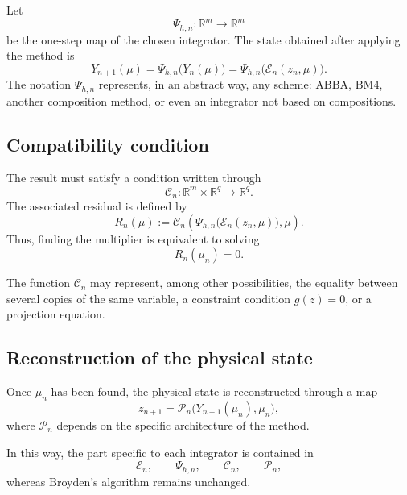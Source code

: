 \documentclass[11pt,a4paper]{article}
\newcommand{\R}{\mathbb{R}}
\begin{document}
Let
\begin{equation}
    \Psi_{h,n}:\R^m\longrightarrow\R^m
    \label{eq:base-integrator}
\end{equation}
be the one-step map of the chosen integrator. The state obtained after
applying the method is
\begin{equation}
    Y_{n+1}(\mu)
    =\Psi_{h,n}\bigl(Y_n(\mu)\bigr)
    =\Psi_{h,n}\bigl(\mathcal E_n(z_n,\mu)\bigr).
    \label{eq:numerical-output}
\end{equation}
The notation $\Psi_{h,n}$ represents, in an abstract way, any scheme: ABBA,
BM4, another composition method, or even an integrator not based on
compositions.

\subsection{Compatibility condition}

The result must satisfy a condition written through
\begin{equation}
    \mathcal C_n:\R^m\times\R^q\longrightarrow\R^q.
    \label{eq:compatibility-map}
\end{equation}
The associated residual is defined by
\begin{equation}
    \boxed{
    R_n(\mu)
    :=\mathcal C_n
    \left(
        \Psi_{h,n}\bigl(\mathcal E_n(z_n,\mu)\bigr),
        \mu
    \right).}
    \label{eq:generic-residual}
\end{equation}
Thus, finding the multiplier is equivalent to solving
\[
    R_n(\mu_n)=0.
\]

The function $\mathcal C_n$ may represent, among other possibilities, the
equality between several copies of the same variable, a constraint condition
$g(z)=0$, or a projection equation.

\subsection{Reconstruction of the physical state}

Once $\mu_n$ has been found, the physical state is reconstructed through a
map
\begin{equation}
    z_{n+1}
    =\mathcal P_n\bigl(Y_{n+1}(\mu_n),\mu_n\bigr),
    \label{eq:reconstruction}
\end{equation}
where $\mathcal P_n$ depends on the specific architecture of the method.

In this way, the part specific to each integrator is contained in
\[
    \mathcal E_n,
    \qquad
    \Psi_{h,n},
    \qquad
    \mathcal C_n,
    \qquad
    \mathcal P_n,
\]
whereas Broyden's algorithm remains unchanged.
\end{document}
